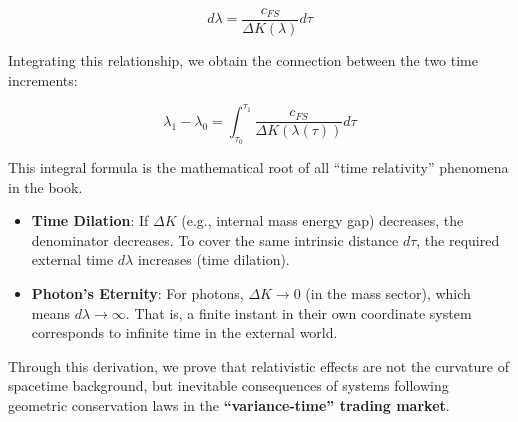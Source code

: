 \[d\lambda = \frac{c_{FS}}{\Delta K(\lambda)} d\tau\]

Integrating this relationship, we obtain the connection between the two time increments:

\[\lambda_1 - \lambda_0 = \int_{\tau_0}^{\tau_1} \frac{c_{FS}}{\Delta K(\lambda(\tau))} d\tau\]

This integral formula is the mathematical root of all ``time relativity'' phenomena in the book.

\begin{itemize}
\item \textbf{Time Dilation}: If $\Delta K$ (e.g., internal mass energy gap) decreases, the denominator decreases. To cover the same intrinsic distance $d\tau$, the required external time $d\lambda$ increases (time dilation).

\item \textbf{Photon's Eternity}: For photons, $\Delta K \to 0$ (in the mass sector), which means $d\lambda \to \infty$. That is, a finite instant in their own coordinate system corresponds to infinite time in the external world.
\end{itemize}

Through this derivation, we prove that relativistic effects are not the curvature of spacetime background, but inevitable consequences of systems following geometric conservation laws in the \textbf{``variance-time'' trading market}.

